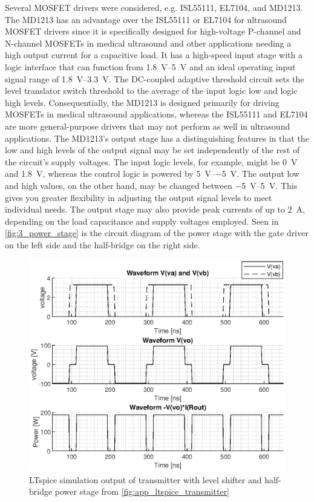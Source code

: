 Several MOSFET drivers were considered, e.g. ISL55111\cite{ISL55111}, EL7104\cite{EL7104}, and MD1213\cite{MD1213}. The MD1213 has an advantage over the ISL55111 or EL7104 for ultrasound MOSFET drivers since it is specifically designed for high-voltage P-channel and N-channel MOSFETs in medical ultrasound and other applications needing a high output current for a capacitive load. It has a high-speed input stage with a logic interface that can function from \qtyrange{1.8}{5}{\volt} and an ideal operating input signal range of \qtyrange{1.8}{3.3}{\volt}. The DC-coupled adaptive threshold circuit sets the level translator switch threshold to the average of the input logic \gls{low} and logic \gls{high} levels. Consequentially, the MD1213 is designed primarily for driving MOSFETs in medical ultrasound applications, whereas the ISL55111 and EL7104 are more general-purpose drivers that may not perform as well in ultrasound applications. The MD1213's output stage has a distinguishing features in that the \gls{low} and \gls{high} levels of the output signal may be set independently of the rest of the circuit's supply voltages. The input logic levels, for example, might be \qty{0}{\volt} and \qty{1.8}{\volt}, whereas the control logic is powered by \qtyrange[retain-explicit-plus]{+5}{-5}{\volt}. The output \gls{low} and \gls{high} values, on the other hand, may be changed between \qtyrange[retain-explicit-plus]{-5}{+5}{\volt}. This gives you greater flexibility in adjusting the output signal levels to meet individual needs. The output stage may also provide peak currents of up to \qty{2}{\ampere}, depending on the load capacitance and supply voltages employed. Seen in \cref{fig:3_power_stage} is the circuit diagram of the power stage with the gate driver on the left side and the half-bridge on the right side.
\begin{figure}[htbp]
	\centering
	\includegraphics[width=.8\textwidth]{Figures/3_transmitter_sim_out.eps}
	\caption{LTspice simulation output of transmitter with level shifter and half-bridge power stage from \cref{fig:app_ltspice_transmitter}}
	\label{fig:3_transmitter_sim}
\end{figure}
